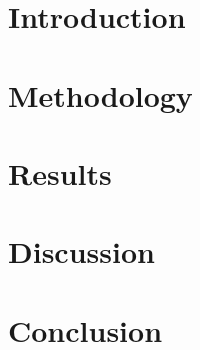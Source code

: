 \documentclass[11pt]{article}
\begin{document}
\section{Introduction}

\section{Methodology}

\section{Results}

\section{Discussion}

\section{Conclusion}
\end{document}
